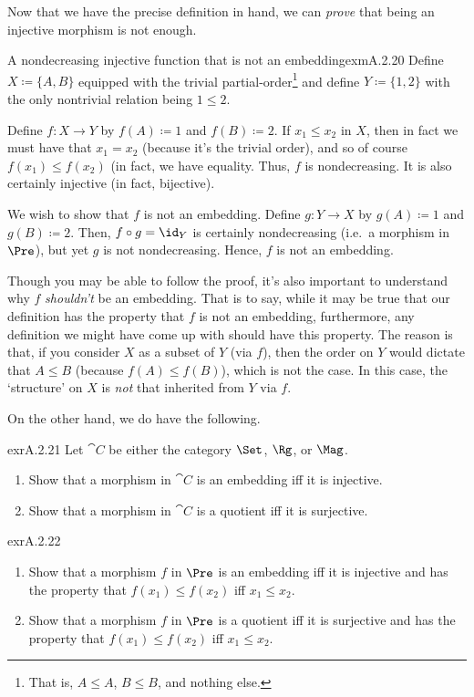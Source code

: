 Now that we have the precise definition in hand, we can \emph{prove} that being an injective morphism is not enough.
\begin{exm}{A nondecreasing injective function that is not an embedding}{exmA.2.20}
Define $X\coloneqq \{ A,B\}$ equipped with the trivial partial-order\footnote{That is, $A\leq A$, $B\leq B$, and nothing else.} and define $Y\coloneqq \{ 1,2\}$ with the only nontrivial relation being $1\leq 2$.

Define $f\colon X\rightarrow Y$ by $f(A)\coloneqq 1$ and $f(B)\coloneqq 2$.  If $x_1\leq x_2$ in $X$, then in fact we must have that $x_1=x_2$ (because it's the trivial order), and so of course $f(x_1)\leq f(x_2)$ (in fact, we have equality.  Thus, $f$ is nondecreasing.  It is also certainly injective (in fact, bijective).

We wish to show that $f$ is not an embedding.  Define $g\colon Y\rightarrow X$ by $g(A)\coloneqq 1$ and $g(B)\coloneqq 2$.  Then, $f\circ g=\id _Y$ is certainly nondecreasing (i.e.~a morphism in $\Pre$), but yet $g$ is not nondecreasing.  Hence, $f$ is not an embedding.
\begin{rmk}
Though you may be able to follow the proof, it's also important to understand why $f$ \emph{shouldn't} be an embedding.  That is to say, while it may be true that our definition has the property that $f$ is not an embedding, furthermore, any definition we might have come up with should have this property.  The reason is that, if you consider $X$ as a subset of $Y$ (via $f$), then the order on $Y$ would dictate that $A\leq B$ (because $f(A)\leq f(B)$), which is not the case.  In this case, the `structure' on $X$ is \emph{not} that inherited from $Y$ via $f$.
\end{rmk}
\end{exm}
On the other hand, we do have the following.
\begin{exr}{}{exrA.2.21}
Let $\cat{C}$ be either the category $\Set$, $\Rg$, or $\Mag$.
\begin{enumerate}
\item Show that a morphism in $\cat{C}$ is an embedding iff it is injective.
\item Show that a morphism in $\cat{C}$ is a quotient iff it is surjective.
\end{enumerate}
\end{exr}
\begin{exr}{}{exrA.2.22}
\begin{enumerate}
\item Show that a morphism $f$ in $\Pre$ is an embedding iff it is injective and has the property that $f(x_1)\leq f(x_2)$ iff $x_1\leq x_2$.
\item Show that a morphism $f$ in $\Pre$ is a quotient iff it is surjective and has the property that $f(x_1)\leq f(x_2)$ iff $x_1\leq x_2$.
\end{enumerate}
\end{exr}

